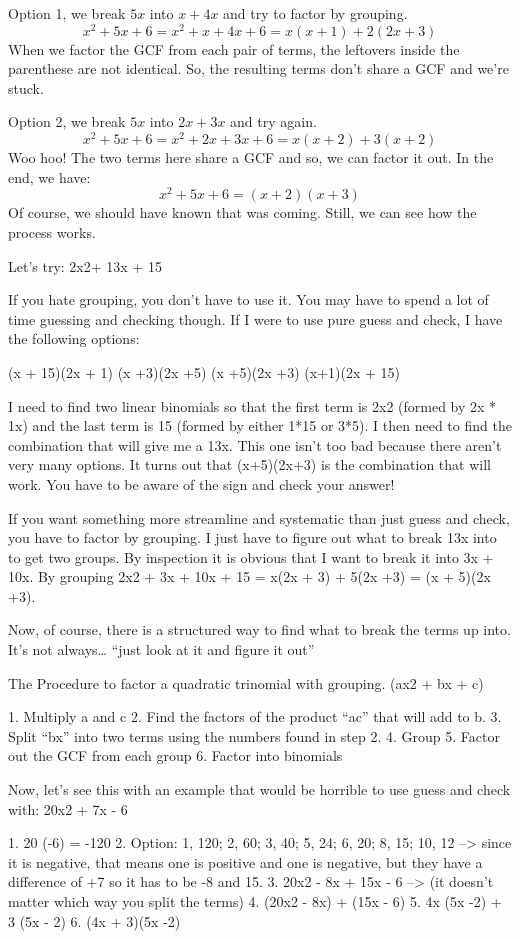 Option 1, we break $5x$ into $x+4x$ and try to factor by grouping.
\[x^2+5x+6 = x^2 + x + 4x + 6 = x(x +1) + 2(2x + 3)\]
When we factor the GCF from each pair of terms, the leftovers inside the parenthese are not identical. So, the resulting terms don't share a GCF and we're stuck.

Option 2, we break $5x$ into $2x+3x$ and try again.
\[x^2+5x+6 = x^2 + 2x + 3x + 6 = x(x+2) + 3(x + 2)\]
Woo hoo! The two terms here share a GCF and so, we can factor it out. In the end, we have:
\[x^2+5x+6 = (x+2)(x+3)\]
Of course, we should have known that was coming. Still, we can see how the process works.


Let's try: 2x2+ 13x + 15

If you hate grouping, you don't have to use it. You may have to spend a lot of time guessing and checking though. If I were to use pure guess and check, I have the following options: 

(x + 15)(2x + 1)		(x +3)(2x +5)		(x +5)(2x +3)		(x+1)(2x + 15)

I need to find two linear binomials so that the first term is 2x2 (formed by 2x * 1x) and the last term is 15 (formed by either 1*15 or 3*5). I then need to find the combination that will give me a 13x. This one isn't too bad because there aren't very many options. It turns out that (x+5)(2x+3) is the combination that will work. You have to be aware of the sign and check your answer!

If you want something more streamline and systematic than just guess and check, you have to factor by grouping. I just have to figure out what to break 13x into to get two groups. By inspection it is obvious that I want to break it into 3x + 10x. By grouping 2x2 + 3x + 10x + 15 = x(2x + 3) + 5(2x +3) = (x + 5)(2x +3).

Now, of course, there is a structured way to find what to break the terms up into. It's not always\ldots{} ``just look at it and figure it out''

The Procedure to factor a quadratic trinomial with grouping. (ax2 + bx + c)

1. Multiply a and c
2. Find the factors of the product ``ac'' that will add to b.
3. Split ``bx'' into two terms using the numbers found in step 2.
4. Group
5. Factor out the GCF from each group
6. Factor into binomials

Now, let's see this with an example that would be horrible to use guess and check with: 20x2 + 7x - 6

1. 20 (-6) = -120
2. Option: 1, 120; 2, 60; 3, 40; 5, 24; 	6, 20; 	8, 15; 10, 12 --> since it is negative, that means one is positive and one is negative, but they have a difference of +7 so it has to be -8 and 15. 
3. 20x2 - 8x + 15x - 6 --> (it doesn't matter which way you split the terms)
4. (20x2 - 8x) + (15x - 6) 
5. 4x (5x -2) + 3 (5x - 2) 
6. (4x + 3)(5x -2)

